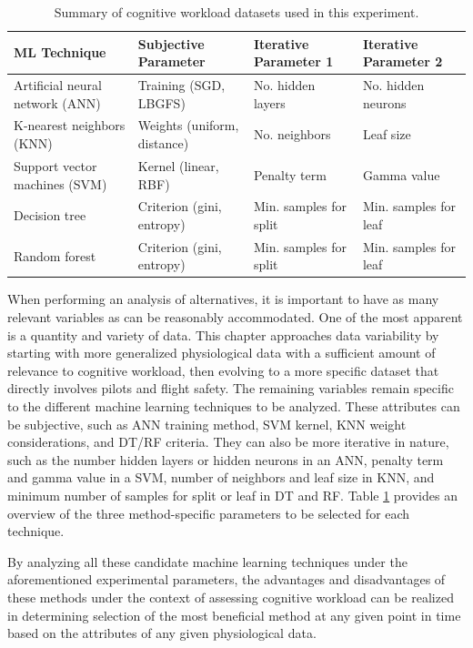 \documentclass[12pt]{uthesis-v12}  %
\begin{document}
\begin{table}[!t]
\caption{Summary of cognitive workload datasets used in this experiment.}
\renewcommand{\arraystretch}{1.3}
\centering
\resizebox{\textwidth}{!}
{\begin{tabular}{*{4}{l}}
\toprule
ML Technique & Subjective Parameter & Iterative Parameter 1 & Iterative Parameter 2 \\ \midrule
Artificial neural network (ANN) & Training (SGD, LBGFS) & No. hidden layers & No. hidden neurons \\
K-nearest neighbors (KNN) & Weights (uniform, distance) & No. neighbors & Leaf size \\
Support vector machines (SVM) & Kernel (linear, RBF) & Penalty term & Gamma value \\
Decision tree & Criterion (gini, entropy) & Min. samples for split & Min. samples for leaf \\
Random forest & Criterion (gini, entropy) & Min. samples for split & Min. samples for leaf \\ \bottomrule
\end{tabular}}
\label{params}
\end{table}

When performing an analysis of alternatives, it is important to have as many relevant variables as can be reasonably accommodated. One of the most apparent is a quantity and variety of data. This chapter approaches data variability by starting with more generalized physiological data with a sufficient amount of relevance to cognitive workload, then evolving to a more specific dataset that directly involves pilots and flight safety. The remaining variables remain specific to the different machine learning techniques to be analyzed. These attributes can be subjective, such as ANN training method, SVM kernel, KNN weight considerations, and DT/RF criteria. They can also be more iterative in nature, such as the number hidden layers or hidden neurons in an ANN, penalty term and gamma value in a SVM, number of neighbors and leaf size in KNN, and minimum number of samples for split or leaf in DT and RF. Table \ref{params} provides an overview of the three method-specific parameters to be selected for each technique.

By analyzing all these candidate machine learning techniques under the aforementioned experimental parameters, the advantages and disadvantages of these methods under the context of assessing cognitive workload can be realized in determining selection of the most beneficial method at any given point in time based on the attributes of any given physiological data.
\end{document}
